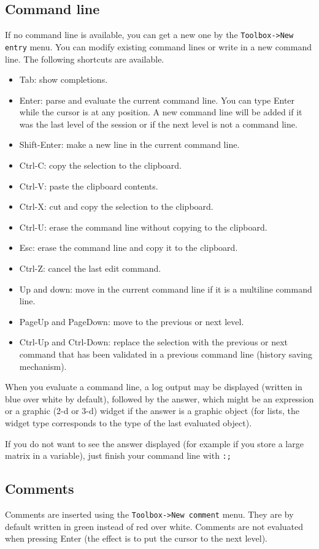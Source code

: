 \documentclass{article}
\begin{document}
\subsection{Command line}
If no command line is available, you can get a new one by the 
\verb|Toolbox->New entry|
menu. You can modify existing command lines or write in a new
command line. The following shortcuts are available.
\begin{itemize}
\item Tab: show completions.
\item Enter: parse and evaluate the current command line. You can
type Enter while the cursor is at any position. A new command line
will be added if it was the last level of the session or if
the next level is not a command line.
\item Shift-Enter: make a new line in the current command line.
\item Ctrl-C: copy the selection to the clipboard.
\item Ctrl-V: paste the clipboard contents.
\item Ctrl-X: cut and copy the selection to the clipboard.
\item Ctrl-U: erase the command line without copying to the clipboard.
\item Esc: erase the command line and copy it to the clipboard.
\item Ctrl-Z: cancel the last edit command.
\item Up and down: move in the current command line if it is a
  multiline command line.
\item PageUp and PageDown: move to the previous or next level.
\item Ctrl-Up and Ctrl-Down: replace the selection with the previous
or next command that has been validated in a previous command line
(history saving mechanism).
\end{itemize}
When you evaluate a command line, a log output may be displayed
(written in blue over white by default), followed by the answer, which
might be an expression or a graphic (2-d or 3-d) widget if the
answer is a graphic object (for lists, the widget type corresponds
to the type of the last evaluated object).

If you do not want to see the answer displayed (for example if
you store a large matrix in a variable), just finish
your command line with \verb|:;|

\subsection{Comments}
Comments are inserted using the \verb|Toolbox->New comment| menu.
They are by default written in green instead of red over white.
Comments are not evaluated when pressing Enter (the effect is to
put the cursor to the next level).
\end{document}
